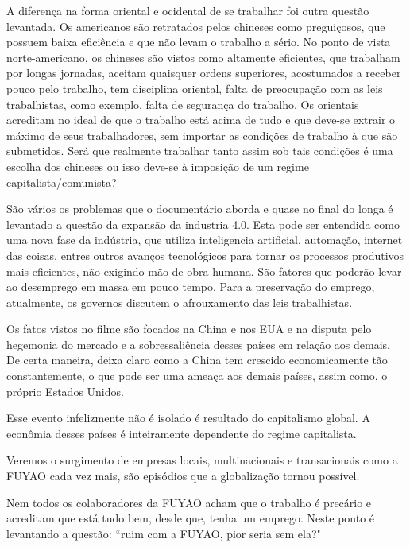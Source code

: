 \documentclass[12pt,a4paper,oneside]{article}
\begin{document}
\begin{onehalfspace}
A diferença na forma oriental e ocidental de se trabalhar foi outra questão levantada. Os americanos são retratados pelos chineses como preguiçosos, que possuem baixa eficiência e que não levam o trabalho a sério. No ponto de vista norte-americano, os chineses são vistos como altamente eficientes, que trabalham por longas jornadas, aceitam quaisquer ordens superiores, acostumados a receber pouco pelo trabalho, tem disciplina oriental, falta de preocupação com as leis trabalhistas, como exemplo, falta de segurança do trabalho. Os orientais acreditam no ideal de que o trabalho está acima de tudo e que deve-se extrair o máximo de seus trabalhadores, sem importar as condições de trabalho à que são submetidos. Será que realmente trabalhar tanto assim sob tais condições é uma escolha dos chineses ou isso deve-se à imposição de um regime  capitalista/comunista?

São vários os problemas que o documentário aborda e quase no final do longa é levantado a questão da expansão da industria 4.0. Esta pode ser entendida como uma nova fase da indústria, que utiliza inteligencia artificial, automação, internet das coisas, entres outros avanços tecnológicos para tornar os processos produtivos mais eficientes, não exigindo mão-de-obra humana. São fatores que poderão levar ao desemprego em massa em pouco tempo. Para a preservação do emprego, atualmente, os governos discutem o afrouxamento das leis trabalhistas. 

Os fatos vistos no filme são focados na China e nos EUA e na disputa pelo hegemonia do mercado e a sobressaliência desses países em relação aos demais. De certa maneira, deixa claro como a China tem crescido economicamente tão constantemente, o que pode ser uma ameaça aos demais países, assim como, o próprio Estados Unidos. 


Esse evento infelizmente não é isolado é resultado do capitalismo global. A econômia desses países é inteiramente dependente do regime capitalista.

Veremos o surgimento de empresas locais, multinacionais e transacionais como a FUYAO cada vez mais, são episódios que a globalização tornou possível.

Nem todos os colaboradores da FUYAO acham que o trabalho é precário e acreditam que está tudo bem, desde que, tenha um emprego. Neste ponto é levantando a questão: ``ruim com a FUYAO, pior seria sem ela?"

\end{onehalfspace}
\end{document}
